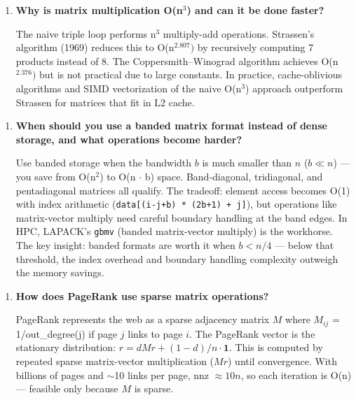 \begin{enumerate}
\item \textbf{Why is matrix multiplication O(n$^{3}$) and can it be done faster?}

The naive triple loop performs n$^{3}$ multiply-add operations. Strassen's algorithm (1969) reduces this to O(n$^{2.807})$ by recursively computing 7 products instead of 8. The Coppersmith--Winograd algorithm achieves O(n$^{2.376})$ but is not practical due to large constants. In practice, cache-oblivious algorithms and SIMD vectorization of the naive O(n$^{3}$) approach outperform Strassen for matrices that fit in L2 cache.
\end{enumerate}

\begin{enumerate}
\item \textbf{When should you use a banded matrix format instead of dense storage, and what operations become harder?}

Use banded storage when the bandwidth $b$ is much smaller than $n$ ($b \ll n$) — you save from O(n$^{2}$) to O(n $\cdot$ b) space. Band-diagonal, tridiagonal, and pentadiagonal matrices all qualify. The tradeoff: element access becomes O(1) with index arithmetic (\texttt{data[(i-j+b) * (2b+1) + j]}), but operations like matrix-vector multiply need careful boundary handling at the band edges. In HPC, LAPACK's \texttt{gbmv} (banded matrix-vector multiply) is the workhorse. The key insight: banded formats are worth it when $b < n/4$ — below that threshold, the index overhead and boundary handling complexity outweigh the memory savings.
\end{enumerate}

\begin{enumerate}
\item \textbf{How does PageRank use sparse matrix operations?}

PageRank represents the web as a sparse adjacency matrix $M$ where $M_{ij}$ = 1/out\_degree(j) if page $j$ links to page $i$. The PageRank vector is the stationary distribution: $r = dM r + (1-d)/n \cdot \mathbf{1}$. This is computed by repeated sparse matrix-vector multiplication ($M r$) until convergence. With billions of pages and $\sim$10 links per page, nnz $\approx 10n$, so each iteration is O(n) — feasible only because $M$ is sparse.
\end{enumerate}

